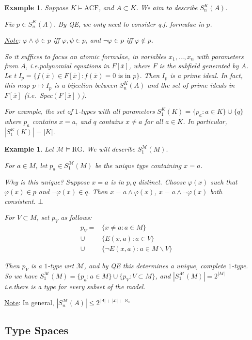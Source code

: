 \documentclass[]{article}
\theoremstyle{custhm}
\theoremstyle{cusdef}
\theoremstyle{custhm}
\theoremstyle{custhm}
\theoremstyle{custhm}
\theoremstyle{ex}
\newtheorem{ex}[theorem]{Example}
\theoremstyle{custhm}
\theoremstyle{cusdef}
\theoremstyle{remark}
\theoremstyle{remark}
\newcommand{\ie}{\textit{i.e.}}
\renewcommand{\L}{\mathcal{L}}
\newcommand{\M}{\mathcal{M}}
\renewcommand{\phi}{\varphi}
\renewcommand{\bar}{\overline}
\newcommand{\false}{\bot}
\newcommand{\acf}{\textrm{ACF}}
\newcommand{\rg}{\textrm{RG}}
\begin{document}
\begin{ex}
Suppose $K\models \acf$, and $A\subset K$. We aim to describe $S_n^K(A)$.

Fix $p \in S_n^K(A)$. By QE, we only need to consider q.f. formulae in $p$.

\underline{Note}: $\phi\land \psi \in p$ iff $\phi,\psi \in p$, and $\neg \phi \in p$ iff $\phi \not\in p$.

So it suffices to focus on atomic formulae, in variables $x_1,\dots,x_n$ with parameters from $A$, \ie polynomial equations in $F[\bar{x}]$, where $F$ is the subfield generated by $A$. Le t $I_p = \{f(\bar{x})\in F[\bar{x}]:f(\bar{x}) = 0\textrm{ is in }p\}$. Then $I_p$ is a prime ideal. In fact, this map $p\mapsto I_p$ is a bijection between $S_n^K(A)$ and the set of prime ideals in $F[\bar{x}]$ (\ie\ Spec$(F[\bar{x}])$).

For example, the set of $1$-types with all parameters $S_1^K(K) = \{p_a:a\in K\}\cup\{q\}$ where $p_a$ contains $x = a$, and $q$ contains $x\ne a$ for all $a \in K$. In particular, $|S_1^K(K)| = |K|$.
\end{ex}
\begin{ex}
Let $\M\models \rg$. We will describe $S_1^\M(M)$.

For $a\in M$, let $p_a\in S_1^\M(M)$ be the unique type containing $x = a$.

Why is this unique? Suppose $x = a$ is in $p,q$ distinct. Choose $\phi(x)$ such that $\phi(x) \in p$ and $\neg\phi(x)\in q$. Then $x =a \land \phi(x)$, $x = a \land \neg\phi(x)$ both consistent. $\false$

For $V\subset M$, set $p_V$ as follows:
\begin{align*}
p_V =& \{x\ne a: a\in M\}\\
\cup&\{E(x,a):a\in V\}\\
\cup&\{\neg E(x,a):a\in M\backslash V\}
\end{align*}

Then $p_V$ is a $1$-type wrt $\M$, and by QE this determines a unique, complete $1$-type. So we have $S_1^\M(M) = \{p_a:a\in M\}\cup\{p_V:V\subset M\}$, and $|S_1^\M(M)| = 2^{|M|}$ \ie there is a type for every subset of the model.
\end{ex}
\underline{Note}: In general, $|S_n^\M(A)| \le 2^{|A| + |\L| + \aleph_0}$

\subsection{Type Spaces}
\end{document}
